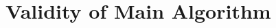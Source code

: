 \documentclass[11pt,reqno]{amsart}
\theoremstyle{plain}
\newtheorem{proposition}[theorem]{Proposition}
\theoremstyle{definition}
\newcommand{\Q}{\bQ}
\newcommand{\Z}{\bZ}
\newcommand{\filip}[1]{{\textcolor{cyan}{Filip: [#1]}}}
\newcommand{\abbey}[1]{\textcolor{blue}{Abbey: #1}}
\newcommand{\travis}[1]{\textcolor{orange}{Travis: #1}}
\newcommand{\abedit}[1]{{\color{blue} #1}}
\begin{document}


\section{Validity of Main Algorithm}
\label{sec:validity}
\end{document}
